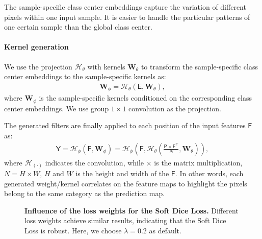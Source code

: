 \documentclass[journal]{IEEEtran}
\begin{document}
The sample-specific class center embeddings 
capture the variation of different pixels within one input sample.
It is easier to handle the particular patterns of one certain sample
than the global class center.

\paragraph{Kernel generation}
We use the projection $\mathcal{H}_{\theta}$ with kernels $\mathbf{W}_{\theta}$ to transform
the sample-specific class center embeddings
to the sample-specific kernels as:
\begin{align}
	\mathbf{W}_{\phi} = \mathcal{H}_{\theta}(\mathsf{E}, \mathbf{W}_{\theta}),
\end{align}
where $\mathbf{W}_{\phi}$ is the sample-specific kernels 
conditioned on the corresponding class center embeddings.
We use group $1 \times 1$ convolution as the projection.

The generated filters are finally applied to each position of the input features $\mathsf{F}$
as:
\begin{align}
  \mathsf{Y} = \mathcal{H}_{\phi}(\mathsf{F}, \mathbf{W}_{\phi})
  = \mathcal{H}_{\phi}(\mathsf{F}, \mathcal{H}_{\theta}(\frac{\mathsf{P} \times \mathsf{F}^{\top}}{N}, \mathbf{W}_{\theta})),
\end{align}
where 
$\mathcal{H}_{(\cdot)}$ indicates the convolution, while $\times$ is the matrix multiplication,
$N=H \times W$, $H$ and $W$ is the height and width of the $\mathsf{F}$.
In other words, 
each generated weight/kernel 
correlates on the feature maps to highlight 
the pixels belong to the same category 
as the prediction map.

\begin{figure}[t]
\centering
{}
\caption{\textbf{Influence of the loss weights for the Soft Dice Loss.}
Different loss weights achieve similar results, indicating that the Soft Dice Loss is robust.
Here, we choose $\lambda = 0.2$ as default.}
\label{fig:loss_weight}
\end{figure}
\end{document}
